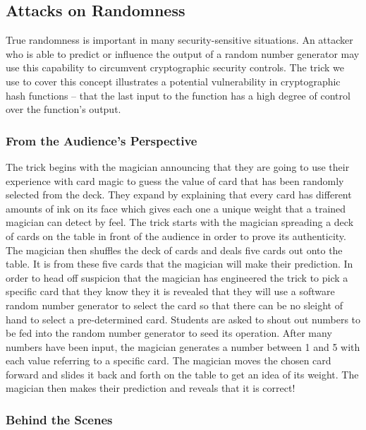 \subsection{Attacks on Randomness}


True randomness is important in many
security-sensitive situations.
An attacker who is able to predict or influence the output of a random number
generator may use this capability to circumvent cryptographic security controls.
The trick we use to cover this concept
illustrates a potential vulnerability in cryptographic hash functions
-- that the last input to the function has a high degree of control over
the function's output.


\subsubsection{From the Audience's Perspective}

The trick begins with the magician announcing that they are going to
use their experience with card magic to guess the value of card that
has been randomly selected from the deck.  They expand by explaining that every
card has different amounts of ink on its face which gives each one a unique
weight that a trained magician can detect by feel.
The trick starts with the magician spreading a deck of cards on the table
in front of the
audience in order to prove its authenticity.
The magician then shuffles the deck of cards and deals five cards out onto the
table.  It is from these five cards that the magician will make their
prediction.
In order to head off suspicion that the magician has engineered the trick to
pick a specific card that they know they it is revealed that
they will use a software random number generator to
select the card so that there can be no sleight of hand to select a
pre-determined card.
Students are asked to shout out numbers to be fed into the random number
generator to seed its operation.  After many numbers have been input, the
magician generates a number between 1 and 5 with each value referring to a
specific card.  The magician moves the chosen card forward and slides it back
and forth on the table to get an idea of its weight.  The magician then makes
their prediction and reveals that it is correct!

\subsubsection{Behind the Scenes}

